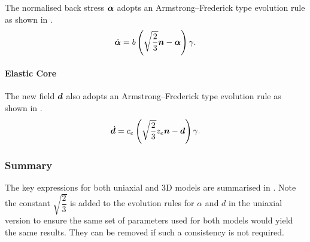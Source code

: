     The normalised back stress $\bm{\alpha}$ adopts an Armstrong--Frederick type \citep{Frederick2007} evolution rule as shown in .
    \begin{gather}
        \dot{\bm{\alpha}}=b\left(\sqrt{\dfrac{2}{3}}\bm{n}-\bm{\alpha}\right)\gamma.
    \end{gather}
    \paragraph{Elastic Core}
    The new field $\bm{d}$ also adopts an Armstrong--Frederick type evolution rule as shown in .
    \begin{gather}
    \dot{\bm{d}}=c_e\left(\sqrt{\dfrac{2}{3}}z_e\bm{n}-\bm{d}\right)\gamma.
\end{gather}
\subsubsection{Summary}
The key expressions for both uniaxial and 3D models are summarised in .
Note the constant $\sqrt{\dfrac{2}{3}}$ is added to the evolution rules for $\alpha$ and $d$ in the uniaxial version to ensure the same set of parameters used for both models would yield the same results.
They can be removed if such a consistency is not required.
